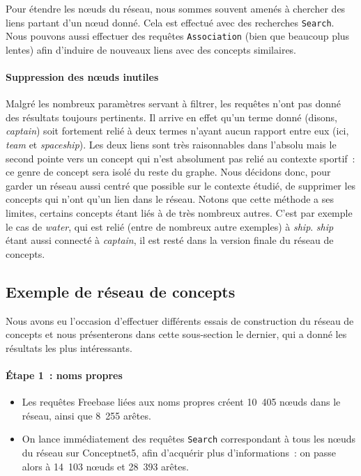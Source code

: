 \documentclass[a4paper, 12pt]{article}
\newcommand{\ang}[1]{\textit{#1}}%
\begin{document}
Pour étendre les n\oe{}uds du réseau, nous sommes souvent amenés à chercher des liens partant d'un n\oe{}ud donné. Cela est effectué avec des recherches \verb|Search|. Nous pouvons aussi effectuer des requêtes \verb|Association| (bien que beaucoup plus lentes) afin d'induire de nouveaux liens avec des concepts similaires.


\paragraph{Suppression des nœuds inutiles}

Malgré les nombreux paramètres servant à filtrer, les requêtes n'ont pas donné des résultats toujours pertinents. Il arrive en effet qu'un terme donné (disons, \ang{captain}) soit fortement relié à deux termes n'ayant aucun rapport entre eux (ici, \ang{team} et \ang{spaceship}). Les deux liens sont très raisonnables dans l'absolu mais le second pointe vers un concept qui n'est absolument pas relié au contexte sportif~: ce genre de concept sera isolé du reste du graphe. Nous décidons donc, pour garder un réseau aussi centré que possible sur le contexte étudié, de supprimer les concepts qui n'ont qu'un lien dans le réseau. Notons que cette méthode a ses limites, certains concepts étant liés à de très nombreux autres. C'est par exemple le cas de \ang{water}, qui est relié (entre de nombreux autre exemples) à \ang{ship}. \ang{ship} étant aussi connecté à \ang{captain}, il est resté dans la version finale du réseau de concepts.


\subsection{Exemple de réseau de concepts}

Nous avons eu l'occasion d'effectuer différents essais de construction du réseau de concepts et nous présenterons dans cette sous-section le dernier, qui a donné les résultats les plus intéressants.

\paragraph{Étape 1~: noms propres}

\begin{itemize}
 \item Les requêtes Freebase liées aux noms propres créent 10~405 n\oe{}uds dans le réseau, ainsi que 8~255 arêtes.
 \item On lance immédiatement des requêtes \texttt{Search} correspondant à tous les n\oe{}uds du réseau sur Conceptnet5, afin d'acquérir plus d'informations~: on passe alors à 14~103 n\oe{}uds et 28~393 arêtes.
\end{itemize}
\end{document}
